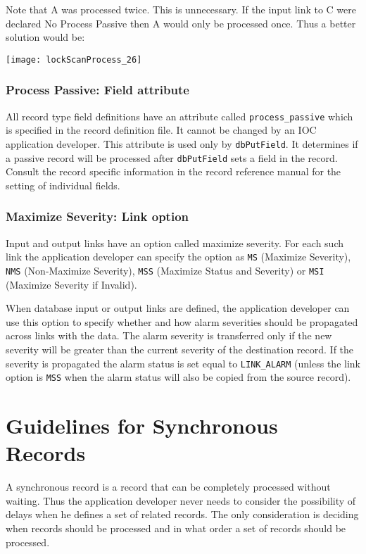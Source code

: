Note that A was processed twice.
This is unnecessary.
If the input link to C were declared No Process Passive then A would only be processed once.
Thus a better solution would be:

\begin{center}
\texttt{[image: lockScanProcess\_26]}
\end{center}

\subsubsection{Process Passive: Field attribute}

All record type field definitions have an attribute called \verb|process_passive| which is specified in the record definition file.
It cannot be changed by an IOC application developer.
This attribute is used only by \verb|dbPutField|.
It determines if a passive record will be processed after \verb|dbPutField| sets a field in the record.
Consult the record specific information in the record reference manual for the setting of individual fields.

\subsubsection{Maximize Severity: Link option}

Input and output links have an option called maximize severity.
For each such link the application developer can specify the option as \verb|MS| (Maximize Severity), \verb|NMS| (Non-Maximize Severity), \verb|MSS| (Maximize Status and Severity) or \verb|MSI| (Maximize Severity if Invalid).

When database input or output links are defined, the application developer can use this option to specify whether and how alarm severities should be propagated across links with the data.
The alarm severity is transferred only if the new severity will be greater than the current severity of the destination record.
If the severity is propagated the alarm status is set equal to \verb|LINK_ALARM| (unless the link option is \verb|MSS| when the alarm status will also be copied from the source record).

\section{Guidelines for Synchronous Records}

A synchronous record is a record that can be completely processed without waiting.
Thus the application developer never needs to consider the possibility of delays when he defines a set of related records.
The only consideration is deciding when records should be processed and in what order a set of records should be processed.

